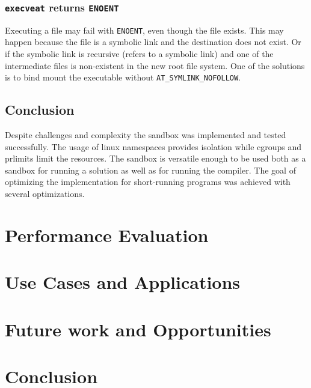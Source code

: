 \documentclass[en]{pracamgr}
\begin{document}
\subsection{\texttt{execveat} returns \texttt{ENOENT}}

Executing a file may fail with \texttt{ENOENT}, even though the file exists. This may happen because the file is a symbolic link and the destination does not exist. Or if the symbolic link is recursive (refers to a symbolic link) and one of the intermediate files is non-existent in the new root file system. One of the solutions is to bind mount the executable without \texttt{AT\_SYMLINK\_NOFOLLOW}.

\section{Conclusion}

Despite challenges and complexity the sandbox was implemented and tested successfully. The usage of linux namespaces provides isolation while cgroups and prlimits limit the resources. The sandbox is versatile enough to be used both as a sandbox for running a solution as well as for running the compiler. The goal of optimizing the implementation for short-running programs was achieved with several optimizations.

\chapter{Performance Evaluation}\label{chapter:performance}

\chapter{Use Cases and Applications}\label{chapter:use_cases}

\chapter{Future work and Opportunities}\label{chapter:future_work}



\chapter{Conclusion}\label{chapter:conclusion}
\end{document}
